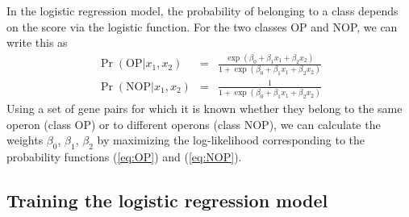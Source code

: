 \documentclass{report}
\begin{document}
In the logistic regression model, the probability of belonging to a class depends on the score via the logistic function. For the two classes OP and NOP, we can write this as
\begin{eqnarray}
\Pr(\mathrm{OP}|x_1, x_2) & = & \frac{\exp(\beta_0 + \beta_1 x_1 + \beta_2 x_2)}{1+\exp(\beta_0 + \beta_1 x_1 + \beta_2 x_2)} \label{eq:OP} \\
\Pr(\mathrm{NOP}|x_1, x_2) & = & \frac{1}{1+\exp(\beta_0 + \beta_1 x_1 + \beta_2 x_2)} \label{eq:NOP} 
\end{eqnarray}
Using a set of gene pairs for which it is known whether they belong to the same operon (class OP) or to different operons (class NOP), we can calculate the weights $\beta_0$, $\beta_1$, $\beta_2$ by maximizing the log-likelihood corresponding to the probability functions (\ref{eq:OP}) and (\ref{eq:NOP}).

\subsection{Training the logistic regression model}
\label{subsec:LogisticRegressionTraining}
\end{document}
